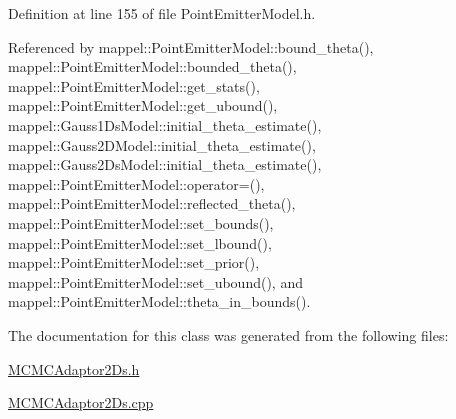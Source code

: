 Definition at line 155 of file Point\+Emitter\+Model.\+h.



Referenced by mappel\+::\+Point\+Emitter\+Model\+::bound\+\_\+theta(), mappel\+::\+Point\+Emitter\+Model\+::bounded\+\_\+theta(), mappel\+::\+Point\+Emitter\+Model\+::get\+\_\+stats(), mappel\+::\+Point\+Emitter\+Model\+::get\+\_\+ubound(), mappel\+::\+Gauss1\+Ds\+Model\+::initial\+\_\+theta\+\_\+estimate(), mappel\+::\+Gauss2\+D\+Model\+::initial\+\_\+theta\+\_\+estimate(), mappel\+::\+Gauss2\+Ds\+Model\+::initial\+\_\+theta\+\_\+estimate(), mappel\+::\+Point\+Emitter\+Model\+::operator=(), mappel\+::\+Point\+Emitter\+Model\+::reflected\+\_\+theta(), mappel\+::\+Point\+Emitter\+Model\+::set\+\_\+bounds(), mappel\+::\+Point\+Emitter\+Model\+::set\+\_\+lbound(), mappel\+::\+Point\+Emitter\+Model\+::set\+\_\+prior(), mappel\+::\+Point\+Emitter\+Model\+::set\+\_\+ubound(), and mappel\+::\+Point\+Emitter\+Model\+::theta\+\_\+in\+\_\+bounds().



The documentation for this class was generated from the following files\+:\begin{DoxyCompactItemize}
\item 
\hyperlink{MCMCAdaptor2Ds_8h}{M\+C\+M\+C\+Adaptor2\+Ds.\+h}\item 
\hyperlink{MCMCAdaptor2Ds_8cpp}{M\+C\+M\+C\+Adaptor2\+Ds.\+cpp}\end{DoxyCompactItemize}
